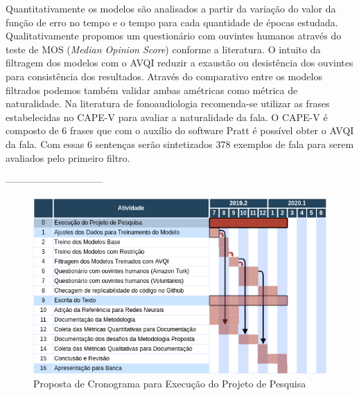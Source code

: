 \documentclass{article}
\begin{document}
Quantitativamente os modelos são analisados a partir da variação do valor da função de erro no tempo e o tempo para cada quantidade de épocas estudada.
Qualitativamente propomos um questionário com ouvintes humanos através do teste de MOS (\textit{Median Opinion Score}) conforme a literatura. 
O intuito da filtragem dos modelos com o AVQI reduzir a exaustão ou desistência dos ouvintes para consistência dos resultados.
Através do comparativo entre os modelos filtrados podemos também validar ambas amétricas como métrica de naturalidade.
Na literatura de fonoaudiologia recomenda-se utilizar as frases estabelecidas no CAPE-V para avaliar a naturalidade da fala. 
O CAPE-V é composto de 6 frases que com o auxílio do software Pratt é possível obter o AVQI da fala.
Com essas 6 sentenças serão sintetizados 378 exemplos de fala para serem avaliados pelo primeiro filtro.

------------------------------
\begin{figure}[h!]
	\centering
	\includegraphics[width=\textwidth]{figuras/cronograma.png}
	\caption{Proposta de Cronograma para Execução do Projeto de Pesquisa}
	\label{fig:processo_de_fala}
\end{figure}

% 

\end{document}
